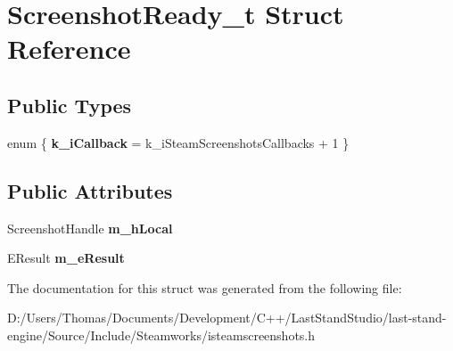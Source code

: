\hypertarget{structScreenshotReady__t}{}\section{Screenshot\+Ready\+\_\+t Struct Reference}
\label{structScreenshotReady__t}
\subsection*{Public Types}
\begin{DoxyCompactItemize}
\item 
\hypertarget{structScreenshotReady__t_afea2c8948071f3db4ff06e1b93167062}{}enum \{ {\bfseries k\+\_\+i\+Callback} = k\+\_\+i\+Steam\+Screenshots\+Callbacks + 1
 \}\label{structScreenshotReady__t_afea2c8948071f3db4ff06e1b93167062}

\end{DoxyCompactItemize}
\subsection*{Public Attributes}
\begin{DoxyCompactItemize}
\item 
\hypertarget{structScreenshotReady__t_ace698ada4845a52633393ca4a205955d}{}Screenshot\+Handle {\bfseries m\+\_\+h\+Local}\label{structScreenshotReady__t_ace698ada4845a52633393ca4a205955d}

\item 
\hypertarget{structScreenshotReady__t_a583be73916a44455c4d234dd53805401}{}E\+Result {\bfseries m\+\_\+e\+Result}\label{structScreenshotReady__t_a583be73916a44455c4d234dd53805401}

\end{DoxyCompactItemize}


The documentation for this struct was generated from the following file\+:\begin{DoxyCompactItemize}
\item 
D\+:/\+Users/\+Thomas/\+Documents/\+Development/\+C++/\+Last\+Stand\+Studio/last-\/stand-\/engine/\+Source/\+Include/\+Steamworks/isteamscreenshots.\+h\end{DoxyCompactItemize}
